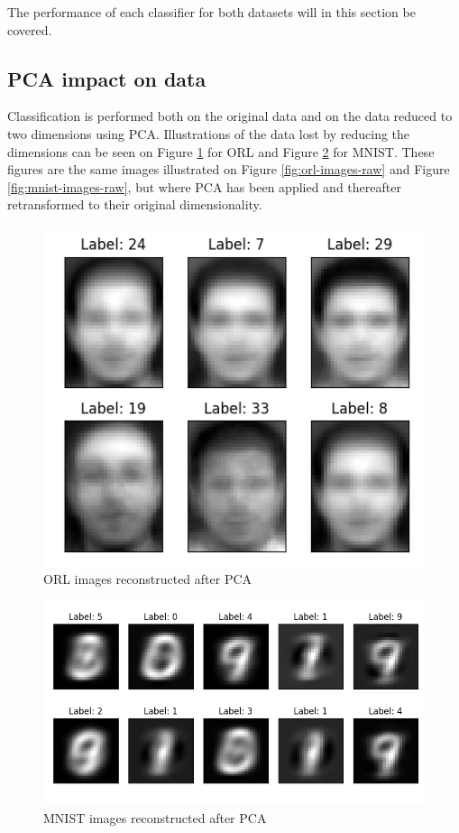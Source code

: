 The performance of each classifier for both datasets will in this section be covered. 

\subsection{PCA impact on data}
Classification is performed both on the original data and on the data reduced to two dimensions using PCA. Illustrations of the data lost by reducing the dimensions can be seen on Figure \ref{fig:orl-images-reconstructed} for ORL and Figure \ref{fig:mnist-images-reconstructed} for MNIST. These figures are the same images illustrated on Figure \ref{fig:orl-images-raw} and Figure \ref{fig:mnist-images-raw}, but where PCA has been applied and thereafter retransformed to their original dimensionality.  

\begin{figure}[htbp]
    \centering
    \includegraphics[width=0.7\columnwidth]{../source/orl/pictures/image-reconstructed-pca.png}
    \caption{ORL images reconstructed after PCA}
    \label{fig:orl-images-reconstructed}
\end{figure}

\begin{figure}[htbp]
    \centering
    \includegraphics[width=0.7\columnwidth]{../source/mnist/pictures/image-reconstructed-pca.png}
    \caption{MNIST images reconstructed after PCA}
    \label{fig:mnist-images-reconstructed}
\end{figure}


